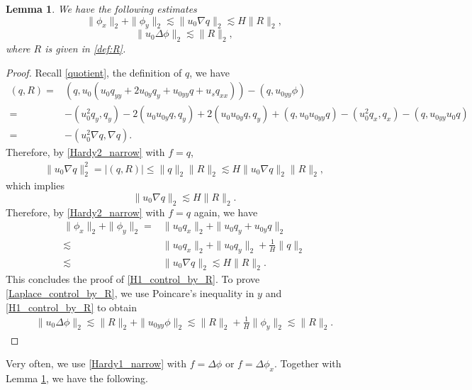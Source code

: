 \documentclass[reqno, 11pt]{amsart}
\theoremstyle{plain}
\newtheorem{lemma}[theorem]{Lemma}
\theoremstyle{definition}
\theoremstyle{remark}
\numberwithin{equation}{section}
\begin{document}
\begin{lemma}\label{lem_H1} We have the following estimates
\begin{equation}\label{H1_control_by_R}
\|\phi_x\|_2 + \|\phi_y\|_2 \lesssim \|u_0 \nabla q\|_2 \lesssim H \|R\|_2,
\end{equation}
\begin{equation}\label{Laplace_control_by_R}
\|u_0 \Delta \phi \|_2 \lesssim \|R\|_2,
\end{equation}
where $R$ is given in \eqref{def:R}.
\end{lemma}
\begin{proof}
Recall \eqref{quotient}, the definition of $q$, we have
\begin{align*}
(q, R) =& (q, u_0(u_0 q_{yy} + 2u_{0y}q_y + u_{0yy}q + u_s q_{xx})) - (q, u_{0yy}\phi)\\
=& - (u_0^2 q_y, q_y) - 2(u_0 u_{0y} q, q_y) + 2(u_0 u_{0y} q, q_y) + (q, u_0 u_{0yy} q) - (u_0^2 q_x, q_x) - (q, u_{0yy}u_0 q)\\
=& -(u_0^2 \nabla q, \nabla q).
\end{align*}
Therefore, by \eqref{Hardy2_narrow} with $f = q$,
\begin{align*}
 \|u_0 \nabla q\|_2^2 = |(q, R)| \le \|q\|_2\|R\|_2 \lesssim H\|u_0 \nabla q\|_2\|R\|_2,
\end{align*}
which implies
$$
\|u_0 \nabla q\|_2 \lesssim  H\|R\|_2.
$$
Therefore, by \eqref{Hardy2_narrow} with $f = q$ again, we have
\begin{align*}
\|\phi_x\|_2 + \| \phi_y\|_2 =& \|u_0 q_x \|_2 + \|u_0 q_y + u_{0y}q \|_2\\
\lesssim& \|u_0 q_x \|_2 + \|u_0 q_y \|_2 + \frac{1}{H} \| q \|_2\\
\lesssim& \|u_0 \nabla q\|_2 \lesssim H \|R\|_2.
\end{align*}
This concludes the proof of \eqref{H1_control_by_R}. To prove \eqref{Laplace_control_by_R}, we use Poincare's inequality in $y$ and \eqref{H1_control_by_R} to obtain
\begin{align*}
\|u_0 \Delta \phi \|_2 \lesssim \|R\|_2 + \| u_{0yy} \phi\|_2 \lesssim \|R\|_2 + \frac{1}{H}\| \phi_y\|_2 \lesssim \|R\|_2.
\end{align*}
\end{proof}

Very often, we use \eqref{Hardy1_narrow} with $f= \Delta \phi$ or $f = \Delta \phi_x$. Together with Lemma \ref{lem_H1}, we have the following.
\end{document}
